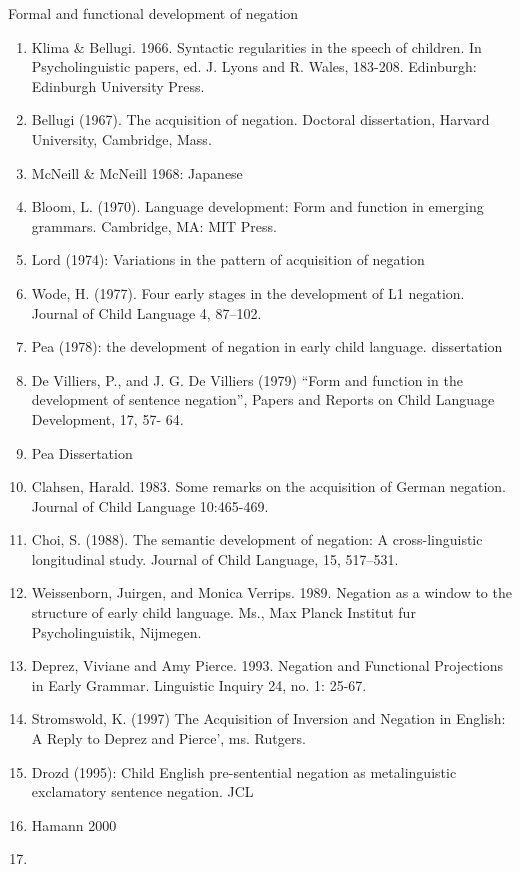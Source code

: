 \documentclass[man,floatsintext,draftall]{apa6}
\begin{document}
Formal and functional development of negation

\begin{enumerate}
\def\labelenumi{\arabic{enumi}.}
\item
  Klima \& Bellugi. 1966. Syntactic regularities in the speech of children. In Psycholinguistic papers, ed. J. Lyons and R. Wales, 183-208. Edinburgh: Edinburgh University Press.
\item
  Bellugi (1967). The acquisition of negation. Doctoral dissertation, Harvard University, Cambridge, Mass.
\item
  McNeill \& McNeill 1968: Japanese
\item
  Bloom, L. (1970). Language development: Form and function in emerging grammars. Cambridge, MA: MIT Press.
\item
  Lord (1974): Variations in the pattern of acquisition of negation
\item
  Wode, H. (1977). Four early stages in the development of L1 negation. Journal of Child Language 4, 87--102.
\item
  Pea (1978): the development of negation in early child language. dissertation
\item
  De Villiers, P., and J. G. De Villiers (1979) \enquote{Form and function in the development of sentence negation}, Papers and Reports on Child Language Development, 17, 57- 64.
\item
  Pea Dissertation
\item
  Clahsen, Harald. 1983. Some remarks on the acquisition of German negation. Journal of Child Language 10:465-469.
\item
  Choi, S. (1988). The semantic development of negation: A cross-linguistic longitudinal study. Journal of Child Language, 15, 517--531.
\item
  Weissenborn, Juirgen, and Monica Verrips. 1989. Negation as a window to the structure of early child language. Ms., Max Planck Institut fur Psycholinguistik, Nijmegen.
\item
  Deprez, Viviane and Amy Pierce. 1993. Negation and Functional Projections in Early Grammar. Linguistic Inquiry 24, no. 1: 25-67.
\item
  Stromswold, K. (1997) The Acquisition of Inversion and Negation in English: A Reply to Deprez and Pierce', ms. Rutgers.
\item
  Drozd (1995): Child English pre-sentential negation as metalinguistic exclamatory sentence negation. JCL
\item
  Hamann 2000
\item

\end{enumerate}
\end{document}
